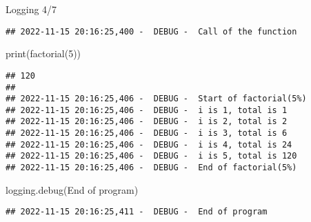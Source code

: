 \documentclass[
  8pt,
  ignorenonframetext,
]{beamer}
\newenvironment{Shaded}{\begin{snugshade}}{\end{snugshade}}
\newcommand{\BuiltInTok}[1]{#1}
\newcommand{\DecValTok}[1]{\textcolor[rgb]{0.00,0.00,0.81}{#1}}
\newcommand{\NormalTok}[1]{#1}
\newcommand{\StringTok}[1]{\textcolor[rgb]{0.31,0.60,0.02}{#1}}
\begin{document}
\begin{frame}[fragile]{Logging 4/7}
\begin{verbatim}
## 2022-11-15 20:16:25,400 -  DEBUG -  Call of the function
\end{verbatim}

\begin{Shaded}
\begin{Highlighting}[]
\BuiltInTok{print}\NormalTok{(factorial(}\DecValTok{5}\NormalTok{))}
\end{Highlighting}
\end{Shaded}

\begin{verbatim}
## 120
## 
## 2022-11-15 20:16:25,406 -  DEBUG -  Start of factorial(5%)
## 2022-11-15 20:16:25,406 -  DEBUG -  i is 1, total is 1
## 2022-11-15 20:16:25,406 -  DEBUG -  i is 2, total is 2
## 2022-11-15 20:16:25,406 -  DEBUG -  i is 3, total is 6
## 2022-11-15 20:16:25,406 -  DEBUG -  i is 4, total is 24
## 2022-11-15 20:16:25,406 -  DEBUG -  i is 5, total is 120
## 2022-11-15 20:16:25,406 -  DEBUG -  End of factorial(5%)
\end{verbatim}

\begin{Shaded}
\begin{Highlighting}[]
\NormalTok{logging.debug(}\StringTok{\textquotesingle{}End of program\textquotesingle{}}\NormalTok{)}
\end{Highlighting}
\end{Shaded}

\begin{verbatim}
## 2022-11-15 20:16:25,411 -  DEBUG -  End of program
\end{verbatim}
\end{frame}
\end{document}
